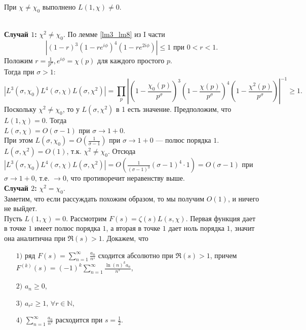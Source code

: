 \begin{lemma} \label{l7_lm7}
	При $\chi \ne \chi_0$ выполнено $L(1, \chi) \ne 0$.
\end{lemma}
\begin{pf}~\\
	\textbf{Случай $1$:} $\chi^2 \ne \chi_0$.
	По лемме \ref{lm3_lm8} из I части
	$$|(1 - r)^3 (1 - re^{i \phi})^4 (1 - re^{2i\phi})| \leq 1 \text{ при } 0 < r < 1.$$
	Положим $\displaystyle r = \frac{1}{p^{\sigma}}, e^{i \phi} = \chi(p)$ для каждого простого $p$.\\
	Тогда при $\sigma > 1$:
	$$|L^3(\sigma, \chi_0) L^4(\sigma, \chi) L (\sigma, \chi^2)| = \prod_p \left|\left(1 - \frac{\chi_0(p)}{p^{\sigma}}\right)^3\left(1 - \frac{\chi(p)}{p^{\sigma}}\right)^4\left(1 - \frac{\chi^2(p)}{p^{\sigma}}\right) \right|^{-1} \geq 1.$$
	Поскольку $\chi^2 \ne \chi_0$, то у $L(\sigma, \chi^2)$ в 1 есть значение. Предположим, что $L(1, \chi) = 0$. Тогда\\
	$L(\sigma, \chi) = O(\sigma - 1)$ при $\sigma \rightarrow 1+0$.\\
	При этом $\displaystyle L(\sigma, \chi_0) = O(\frac{1}{\sigma - 1})$ при $\sigma \rightarrow 1+0$ — полюс порядка $1$.\\
	$L(\sigma, \chi^2) = O(1)$, т.к. $\chi^2 \ne \chi_0$.
	Отсюда $\displaystyle |L^3(\sigma, \chi_0) L^4(\sigma, \chi) L(\sigma, \chi^2)| = O(\frac{1}{(\sigma - 1)^3} (\sigma - 1)^4 \cdot 1) = O(\sigma - 1)$ при $\sigma \rightarrow 1+0$, т.е. $\rightarrow 0$, что противоречит неравенству выше.\\
	\textbf{Случай $2$:} $\chi^2 = \chi_0$.\\
	Заметим, что если рассуждать похожим образом, то мы получим $O(1)$, и ничего не выйдет.\\
	Пусть $L(1, \chi) = 0$. Рассмотрим $F(s) = \zeta(s) L(s, \chi)$. Первая функция дает в точке $1$ имеет полюс порядка $1$, а вторая в точке $1$ дает ноль порядка $1$, значит она аналитична при $\Re(s) > 1$.
	Докажем, что
	\begin{itemize}[nolistsep]
		\item[$1)$] ряд $\displaystyle F(s) = \sum\limits_{n=1}^\infty \frac{a_n}{n^s}$ сходится абсолютно при $\Re(s) > 1$, причем $\displaystyle F^{(k)}(s) = (-1)^k \sum_{n = 1}^{\infty} \frac{\ln(n)^k a_n}{n^s}$,
		\item[$2)$] $a_n \geq 0$,
		\item[$3)$] $a_{r^2} \geq 1, \, \forall r \in \mathbb{N}$,
		\item[$4)$] $\displaystyle \sum\limits_{n=1}^\infty \frac{a_n}{n^s} $ расходится при $\displaystyle s = \frac{1}{2}$.

\end{itemize}
\end{pf}
